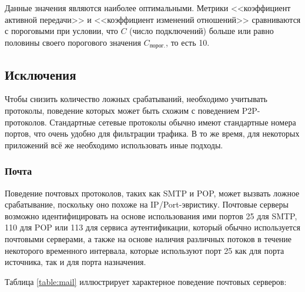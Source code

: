 \documentclass[bachelor, och, coursework]{SCWorks}
\begin{document}
Данные значения являются наиболее оптимальными. Метрики <<коэффициент активной передачи>> и <<коэффициент изменений отношений>> сравниваются с пороговыми при условии, что $C$ (число подключений) больше или равно половины своего порогового значения $C_{\text{порог.}}$, то есть 10. 


\subsection{Исключения}
Чтобы снизить количество ложных срабатываний, необходимо учитывать протоколы, поведение которых может быть схожим с поведением P2P-протоколов. Стандартные сетевые протоколы обычно имеют стандартные номера портов, что очень удобно для фильтрации трафика. В то же время, для некоторых приложений всё же необходимо использовать иные подходы.

\subsubsection{Почта}
Поведение почтовых протоколов, таких как SMTP и POP, может вызвать ложное срабатывание, поскольку оно похоже на IP/Port-эвристику. Почтовые серверы возможно идентифицировать на основе использования ими портов 25 для SMTP, 110 для POP или 113 для сервиса аутентификации, который обычно используется почтовыми серверами, а также на основе наличия различных потоков в течение некоторого временного интервала, которые используют порт 25 как для порта источника, так и для порта назначения.

Таблица \ref{table:mail} иллюстрирует характерное поведение почтовых серверов:
\end{document}
